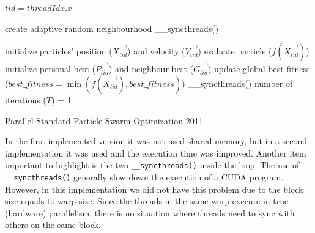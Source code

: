 \documentclass{article}
\begin{document}
    \begin{algorithm}[H]
        
        $tid = threadIdx.x\;$

        create adaptive random neighbourhood\;
        \_\_syncthreads()\;

        initialize particles' position ($\vec{X_{tid}}$) and velocity ($\vec{V_{tid}}$)\;
        evaluate particle ($f(\vec{X_{tid}})$)\;
        initialize personal best ($\vec{P_{tid}}$) and neighbour best ($\vec{G_{tid}}$)\;
        update global best fitness ($best\_fitness=\min(f(\vec{X_{tid}}), best\_fitness)$)\;
        \_\_syncthreads()\;
        number of iterations ($T$) = 1\;
        
        
        \caption{Parallel Standard Particle Swarm Optimization 2011}
        \label{alg:pspso2011}
    \end{algorithm}

    In the first implemented version it was not used shared memory, but in a second implementation it was used and the execution time was improved.
    Another item important to highlight is the two \texttt{\_\_syncthreads()} inside the loop.
    The use of \texttt{\_\_syncthreads()} generally slow down the execution of a CUDA program.
    However, in this implementation we did not have this problem due to the block size equals to warp size.
    Since the threads in the same warp execute in true (hardware) parallelism, there is no situation where threads need to sync with others on the same block.
\end{document}
